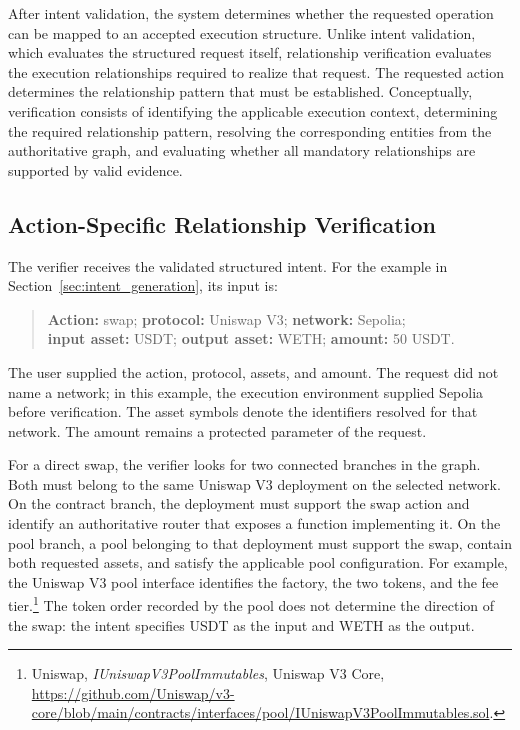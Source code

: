 After intent validation, the system determines whether the requested operation
can be mapped to an accepted execution structure. Unlike intent validation,
which evaluates the structured request itself, relationship verification
evaluates the execution relationships required to realize that request. The requested action determines the relationship pattern that must be
established. Conceptually, verification consists of identifying the applicable
execution context, determining the required relationship pattern, resolving the
corresponding entities from the authoritative graph, and evaluating whether all
mandatory relationships are supported by valid evidence.


\subsection{Action-Specific Relationship Verification}

The verifier receives the validated structured intent. For the example in
Section~\ref{sec:intent_generation}, its input is:

\begin{quote}
\small
\textbf{Action:} swap; \textbf{protocol:} Uniswap V3;
\textbf{network:} Sepolia;\\
\textbf{input asset:} USDT; \textbf{output asset:} WETH;
\textbf{amount:} 50 USDT.
\end{quote}

The user supplied the action, protocol, assets, and amount. The request
did not name a network; in this example, the execution environment supplied
Sepolia before verification. The asset symbols denote the identifiers
resolved for that network. The amount remains a protected parameter of the
request.

For a direct swap, the verifier looks for two connected branches in the
graph. Both must belong to the same Uniswap V3 deployment on the selected
network. On the contract branch, the deployment must support the swap
action and identify an authoritative router that exposes a function
implementing it. On the pool branch, a pool belonging to that deployment
must support the swap, contain both requested assets, and satisfy the
applicable pool configuration. For example, the Uniswap V3 pool interface
identifies the factory, the two tokens, and the fee tier.\footnote{Uniswap,
\textit{IUniswapV3PoolImmutables}, Uniswap V3 Core,
\url{https://github.com/Uniswap/v3-core/blob/main/contracts/interfaces/pool/IUniswapV3PoolImmutables.sol}.}
The token order recorded by the pool does not determine the direction
of the swap: the intent specifies USDT as the input and WETH as the output.

